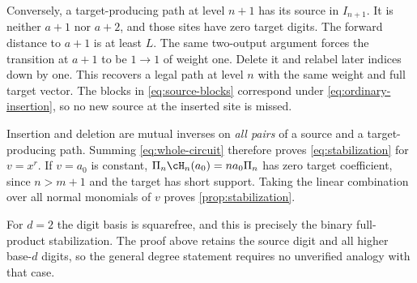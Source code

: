 Conversely, a target-producing path at level $n+1$ has its source
in $I_{n+1}$. It is neither $a+1$ nor $a+2$, and those sites
have zero target digits. The forward distance to $a+1$ is at
least $L$. The same two-output argument forces the transition
at $a+1$ to be $1\to1$ of weight one. Delete it and relabel
later indices down by one. This recovers a legal path at level $n$
with the same weight and full target vector. The blocks in
\eqref{eq:source-blocks} correspond under \eqref{eq:ordinary-insertion},
so no new source at the inserted site is missed.

Insertion and deletion are mutual inverses on \emph{all pairs}
of a source and a target-producing path. Summing
\eqref{eq:whole-circuit} therefore proves
\eqref{eq:stabilization} for $v=x^r$. If $v=a_0$ is constant,
$\Pi_n\cH_n(a_0)=na_0\Pi_n$ has zero target coefficient,
since $n>m+1$ and the target has short support. Taking the
linear combination over all normal monomials of $v$ proves
\cref{prop:stabilization}.

For $d=2$ the digit basis is squarefree, and this is precisely
the binary full-product stabilization. The proof above retains
the source digit and all higher base-$d$ digits, so the general
degree statement requires no unverified analogy with that case.
